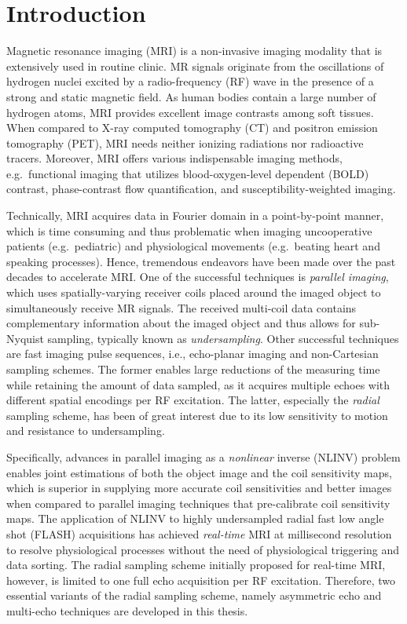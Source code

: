 \chapter{Introduction} \label{Chp:intro}

Magnetic resonance imaging (\acs{MRI}) is a non-invasive imaging modality that is extensively used in routine clinic. MR signals originate from the oscillations of hydrogen nuclei excited by a radio-frequency (\acs{RF}) wave in the presence of a strong and static magnetic field. As human bodies contain a large number of hydrogen atoms, MRI provides excellent image contrasts among soft tissues. When compared to X-ray computed tomography (CT) and positron emission tomography (PET), MRI needs neither ionizing radiations nor radioactive tracers. Moreover, MRI offers various indispensable imaging methods, e.g.~functional imaging that utilizes blood-oxygen-level dependent (\acs{BOLD}) contrast, phase-contrast flow quantification, and susceptibility-weighted imaging.

Technically, MRI acquires data in Fourier domain in a point-by-point manner, which is time consuming and thus problematic when imaging uncooperative patients (e.g.~pediatric) and physiological movements (e.g.~beating heart and speaking processes). Hence, tremendous endeavors have been made over the past decades to accelerate MRI. One of the successful techniques is \textit{parallel imaging}, which uses spatially-varying receiver coils placed around the imaged object to simultaneously receive MR signals. The received multi-coil data contains complementary information about the imaged object and thus allows for sub-Nyquist sampling, typically known as \textit{undersampling}. Other successful techniques are fast imaging pulse sequences, i.e., echo-planar imaging and non-Cartesian sampling schemes. The former enables large reductions of the measuring time while retaining the amount of data sampled, as it acquires multiple echoes with different spatial encodings per RF excitation. The latter, especially the \textit{radial} sampling scheme, has been of great interest due to its low sensitivity to motion and resistance to undersampling.

Specifically, advances in parallel imaging as a \textit{nonlinear} inverse (\acs{NLINV}) problem enables joint estimations of both the object image and the coil sensitivity maps, which is superior in supplying more accurate coil sensitivities and better images when compared to parallel imaging techniques that pre-calibrate coil sensitivity maps. The application of NLINV to highly undersampled radial fast low angle shot (\acs{FLASH}) acquisitions has achieved \textit{real-time} MRI at millisecond resolution to resolve physiological processes without the need of physiological triggering and data sorting. The radial sampling scheme initially proposed for real-time MRI, however, is limited to one full echo acquisition per RF excitation. Therefore, two essential variants of the radial sampling scheme, namely asymmetric echo and multi-echo techniques are developed in this thesis. 

